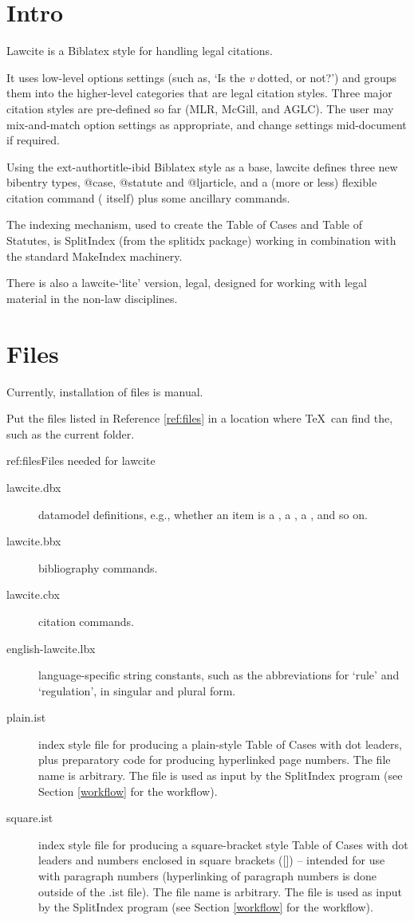 \section{Intro}
\p Lawcite is a Biblatex style for handling legal citations.

\p It uses low-level options settings (such as, `Is the \textit{v} dotted, or not?') and groups them into the higher-level categories that are legal citation styles. Three major citation styles are pre-defined so far (MLR, McGill, and AGLC). The user may mix-and-match option settings as  appropriate, and change settings mid-document if required.

\p Using the ext-authortitle-ibid Biblatex style as a base, lawcite defines three new bibentry types, @case, @statute and @ljarticle, and a (more or less) flexible citation command ( itself) plus some ancillary commands. 

\p The indexing mechanism, used to create the Table of Cases and Table of Statutes, is SplitIndex (from the splitidx package) working in combination with the standard MakeIndex machinery.

\p There is also a lawcite-`lite' version, legal, designed for working with legal material in the non-law disciplines.

\section{Files}
\p Currently, installation of files is manual.

\p Put the files listed in Reference \ref{ref:files} in a location where \TeX\ can find the, such as the current folder.

\begin{dor}{ref:files}{Files needed for lawcite}
\begin{description}
\item[lawcite.dbx]  datamodel definitions, e.g., whether an item is a , a , a , and so on.
\item[lawcite.bbx]  bibliography commands.
\item[lawcite.cbx]  citation commands.
\item[english-lawcite.lbx]  language-specific string constants, such as the abbreviations for `rule' and `regulation', in singular and plural form.
\item[plain.ist] index style file for producing a plain-style Table of Cases with dot leaders, plus preparatory code for producing hyperlinked page numbers. The file name is arbitrary. The file is used as input by the SplitIndex program (see Section \ref{workflow} for the workflow). 
\item[square.ist] index style file for producing a square-bracket style Table of Cases with dot leaders and numbers enclosed in square brackets ([]) -- intended for use with paragraph numbers (hyperlinking of paragraph numbers is done outside of the .ist file). The file name is arbitrary. The file is used as input by the SplitIndex program (see Section \ref{workflow} for the workflow).
\end{description}
\end{dor}

